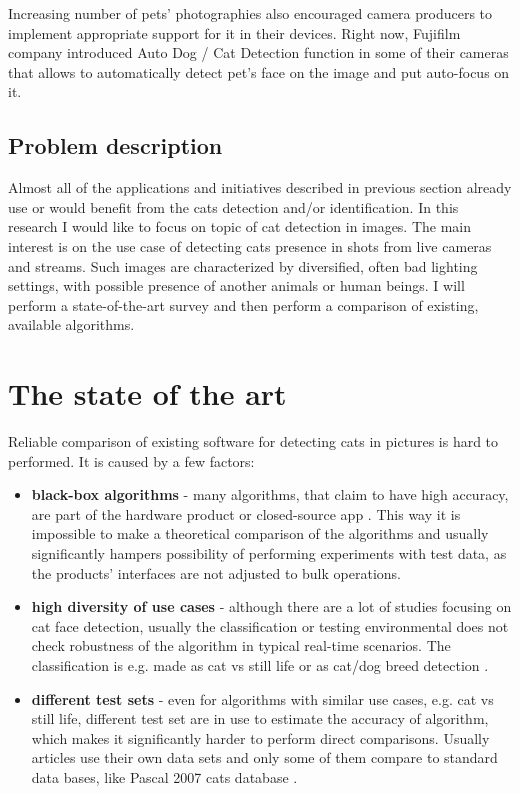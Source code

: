 \documentclass[hyperref]{acmtrans2e}
\begin{document}
Increasing number of pets' photographies also encouraged camera producers to implement appropriate support for it in their devices. Right now, Fujifilm company introduced Auto Dog / Cat Detection function \cite{FujiFilm:2009} in some of their cameras that allows to automatically detect pet's face on the image and put auto-focus on it. 
 
\subsection{Problem description}
Almost all of the applications and initiatives described in previous section already use or would benefit from the cats detection and/or identification. In this research I would like to focus on topic of cat detection in images. The main interest is on the use case of detecting cats presence in shots from live cameras and streams. Such images are characterized by  diversified, often bad lighting settings, with possible presence of another animals or human beings. I will perform a state-of-the-art survey and then perform a comparison of existing, available algorithms. 

\section{The state of the art}
Reliable comparison of existing software for detecting cats in pictures is hard to performed. It is caused by a few factors:
\begin{itemize}
\item \textbf{black-box algorithms} - many algorithms, that claim to have high accuracy, are part of the hardware product \cite{CatFi:2015} or closed-source app \cite{PiP:2013}. This way it is impossible to make a theoretical comparison of the algorithms and usually significantly hampers possibility of performing experiments with test data, as the products' interfaces are not adjusted to bulk operations. 
\item \textbf{high diversity of use cases} - although there are a lot of studies focusing on cat face detection, usually the classification or testing environmental does not check robustness of the algorithm in typical real-time scenarios. The classification is e.g. made as cat vs still life \cite{features:2007,edges:2011} or as cat/dog breed detection \cite{breed:2012}.
\item \textbf{different test sets} - even for algorithms with similar use cases, e.g. cat vs still life, different test set are in use to estimate the accuracy of algorithm, which makes it significantly harder to perform direct comparisons. Usually articles use their own data sets \cite{breed:2012,features:2007,edges:2011} and only some of them compare to standard data bases, like Pascal 2007 cats database \cite{breed:2012}. 
\end{itemize}
\end{document}
